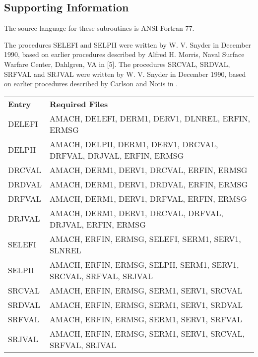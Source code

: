 \documentclass[twoside]{MATH77}
\begin{document}
\subsection{Supporting Information}

The source language for these subroutines is ANSI Fortran 77.

The procedures SELEFI and SELPII were written by W. V. Snyder in December
1990, based on earlier procedures described by Alfred H. Morris, Naval
Surface Warfare Center, Dahlgren, VA in [5]. The procedures SRCVAL,
SRDVAL, SRFVAL and SRJVAL were written by W. V. Snyder in December 1990,
based on earlier procedures described by Carlson and Notis in \cite{Carlson:1981:AAI}.


\begin{tabular}{@{\bf}l@{\hspace{5pt}}l}
\bf Entry & \hspace{.35in} {\bf Required Files}\vspace{2pt} \\
DELEFI & \parbox[t]{2.7in}{ \raggedright
AMACH, DELEFI, DERM1, DERV1, DLNREL, ERFIN, ERMSG\rule[-5pt]{0pt}{8pt}}\\DELPII & \parbox[t]{2.7in}{ \raggedright
AMACH, DELPII, DERM1, DERV1, DRCVAL, DRFVAL, DRJVAL, ERFIN, ERMSG\rule[-5pt]{0pt}{8pt}}\\DRCVAL & \parbox[t]{2.7in}{ \raggedright
AMACH, DERM1, DERV1, DRCVAL, ERFIN, ERMSG\rule[-5pt]{0pt}{8pt}}\\DRDVAL & \parbox[t]{2.7in}{ \raggedright
AMACH, DERM1, DERV1, DRDVAL, ERFIN, ERMSG\rule[-5pt]{0pt}{8pt}}\\DRFVAL & \parbox[t]{2.7in}{ \raggedright
AMACH, DERM1, DERV1, DRFVAL, ERFIN, ERMSG\rule[-5pt]{0pt}{8pt}}\\DRJVAL & \parbox[t]{2.7in}{ \raggedright
AMACH, DERM1, DERV1, DRCVAL, DRFVAL, DRJVAL, ERFIN, ERMSG\rule[-5pt]{0pt}{8pt}}\\SELEFI & \parbox[t]{2.7in}{ \raggedright
AMACH, ERFIN, ERMSG, SELEFI, SERM1, SERV1, SLNREL\rule[-5pt]{0pt}{8pt}}\\SELPII & \parbox[t]{2.7in}{ \raggedright
AMACH, ERFIN, ERMSG, SELPII, SERM1, SERV1, SRCVAL, SRFVAL, SRJVAL\rule[-5pt]{0pt}{8pt}}\\SRCVAL & \parbox[t]{2.7in}{ \raggedright
AMACH, ERFIN, ERMSG, SERM1, SERV1, SRCVAL\rule[-5pt]{0pt}{8pt}}\\SRDVAL & \parbox[t]{2.7in}{ \raggedright
AMACH, ERFIN, ERMSG, SERM1, SERV1, SRDVAL\rule[-5pt]{0pt}{8pt}}\\SRFVAL & \parbox[t]{2.7in}{ \raggedright
AMACH, ERFIN, ERMSG, SERM1, SERV1, SRFVAL\rule[-5pt]{0pt}{8pt}}\\SRJVAL & \parbox[t]{2.7in}{ \raggedright
AMACH, ERFIN, ERMSG, SERM1, SERV1, SRCVAL, SRFVAL, SRJVAL\rule[-5pt]{0pt}{8pt}}\\\end{tabular}
\end{document}
